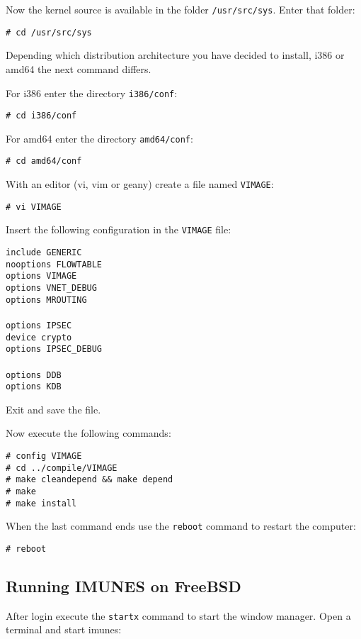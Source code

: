 Now the kernel source is available in the folder \texttt{/usr/src/sys}. Enter
that folder:

\texttt{\# cd /usr/src/sys}

Depending which distribution architecture you have decided to install, i386 or
amd64 the next command differs.

For i386 enter the directory \texttt{i386/conf}:

\texttt{\# cd i386/conf}

For amd64 enter the directory \texttt{amd64/conf}:

\texttt{\# cd amd64/conf}

With an editor (vi, vim or geany) create a file named \texttt{VIMAGE}:

\texttt{\# vi VIMAGE}

Insert the following configuration in the \texttt{VIMAGE} file:

\texttt{include	GENERIC \\
nooptions FLOWTABLE \\
options VIMAGE \\
options VNET\_DEBUG \\
options MROUTING \\
 \\
options IPSEC \\
device crypto \\
options IPSEC\_DEBUG \\
 \\
options DDB \\
options KDB \\
}

Exit and save the file.

Now execute the following commands:
\begin{verbatim}
# config VIMAGE
# cd ../compile/VIMAGE
# make cleandepend && make depend
# make
# make install
\end{verbatim}

When the last command ends use the \texttt{reboot} command to restart the
computer:

\texttt{\# reboot}

\subsection{Running IMUNES on FreeBSD}

After login execute the \texttt{startx} command to start the window manager.
Open a terminal and start imunes:

